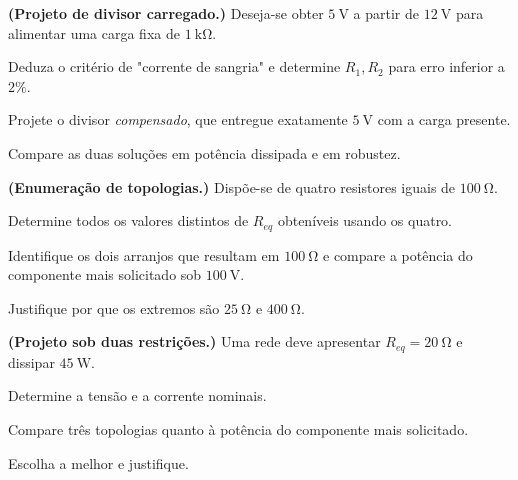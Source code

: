 \blocodesafio
\begin{questao}[4]{}

\textbf{(Projeto de divisor carregado.)} Deseja-se obter $\SI{5}{\volt}$ a
partir de $\SI{12}{\volt}$ para alimentar uma carga fixa de
$\SI{1}{\kilo\ohm}$.
\begin{itensq}
\item Deduza o critério de "corrente de sangria" e determine $R_1,R_2$ para
      erro inferior a $2\%$.
\item Projete o divisor \emph{compensado}, que entregue exatamente
      $\SI{5}{\volt}$ com a carga presente.
\item Compare as duas soluções em potência dissipada e em robustez.
\end{itensq}


\end{questao}
\begin{questao}[4]{}

\textbf{(Enumeração de topologias.)} Dispõe-se de quatro resistores iguais de
$\SI{100}{\ohm}$.
\begin{itensq}
\item Determine todos os valores distintos de $R_{eq}$ obteníveis usando os
      quatro.
\item Identifique os dois arranjos que resultam em $\SI{100}{\ohm}$ e
      compare a potência do componente mais solicitado sob
      $\SI{100}{\volt}$.
\item Justifique por que os extremos são $\SI{25}{\ohm}$ e
      $\SI{400}{\ohm}$.
\end{itensq}


\end{questao}
\begin{questao}[4]{}

\textbf{(Projeto sob duas restrições.)} Uma rede deve apresentar
$R_{eq}=\SI{20}{\ohm}$ e dissipar $\SI{45}{\watt}$.
\begin{itensq}
\item Determine a tensão e a corrente nominais.
\item Compare três topologias quanto à potência do componente mais solicitado.
\item Escolha a melhor e justifique.
\end{itensq}


\end{questao}
